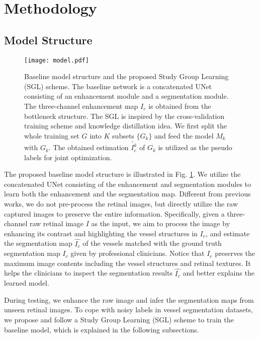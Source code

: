\documentclass[runningheads]{llncs}
\begin{document}
\section{Methodology}
\subsection{Model Structure}
\begin{figure}[t]\centering
\texttt{[image: model.pdf]}
\caption{Baseline model structure and the proposed Study Group Learning (SGL) scheme. The baseline network is a concatenated UNet consisting of an enhancement module and a segmentation module. The three-channel enhancement map $I_e$ is obtained from the bottleneck structure. The SGL is inspired by the cross-validation training scheme and knowledge distillation idea. We first split the whole training set $G$ into $K$ subsets $\{G_k\}$ and feed the model $M_k$ with $G_k$. The obtained estimation $\tilde{I_c^k}$ of $G_k$ is utilized as the pseudo labels for joint optimization.}
\label{fig:model}
\end{figure}
The proposed baseline model structure is illustrated in Fig. \ref{fig:model}. We utilize the concatenated UNet consisting of the enhancement and segmentation modules to learn both the enhancement and the segmentation map. Different from previous works, we do not pre-process the retinal images, but directly utilize the raw captured images to preserve the entire information. Specifically, given a three-channel raw retinal image $I$ as the input, we aim to process the image by enhancing its contrast and highlighting the vessel structures in $I_e$, and estimate the segmentation map $\hat{I_c}$ of the vessels matched with the ground truth segmentation map $I_c$ given by professional clinicians. Notice that $I_e$ preserves the maximum image contents including the vessel structures and retinal textures. It helps the clinicians to inspect the segmentation results $\hat{I_c}$ and better explains the learned model. 

During testing, we enhance the raw image and infer the segmentation maps from unseen retinal images. To cope with noisy labels in vessel segmentation datasets, we propose and follow a Study Group Learning (SGL) scheme to train the baseline model, which is explained in the following subsections. 
\end{document}
